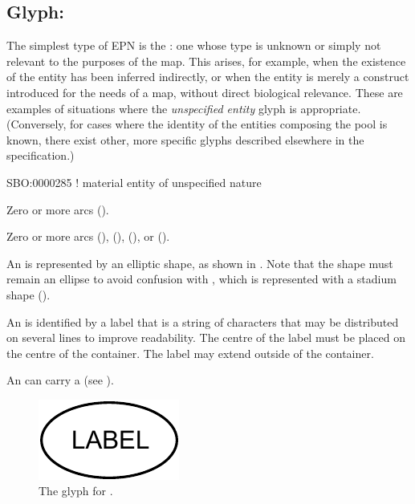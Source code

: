 \subsection{Glyph: }
\label{sec:unspecifiedEntity}

The simplest type of EPN is the : one whose type is unknown or simply not relevant to the purposes of the map.
This arises, for example, when the existence of the entity has been inferred indirectly, or when the entity is merely a construct introduced for the needs of a map, without direct biological relevance.
These are examples of situations where the \emph{unspecified entity} glyph is appropriate.
(Conversely, for cases where the identity of the entities composing the pool is known, there exist other, more specific glyphs described elsewhere in the specification.)

\begin{glyphDescription}

\glyphSboTerm
 SBO:0000285 ! material entity of unspecified nature

\glyphIncoming
Zero or more  arcs ().

\glyphOutgoing
Zero or more  arcs (),  (),  (), or  ().

\glyphContainer
An  is represented by an elliptic shape, as shown in .
Note that the shape must remain an ellipse to avoid confusion with , which is represented with a stadium shape ().

\glyphLabel
An  is identified by a label  that is a string of characters that may be distributed on several lines to improve readability.
The centre of the label must be placed on the centre of the container.
The label may extend outside of the container.

\glyphAux
An  can carry a  (see ).

\end{glyphDescription}

\begin{figure}[H]
  \centering
  \includegraphics{images/build/unspecified.pdf}
  \caption{The \PD glyph for .}
  \label{fig:unspecified}
\end{figure}

